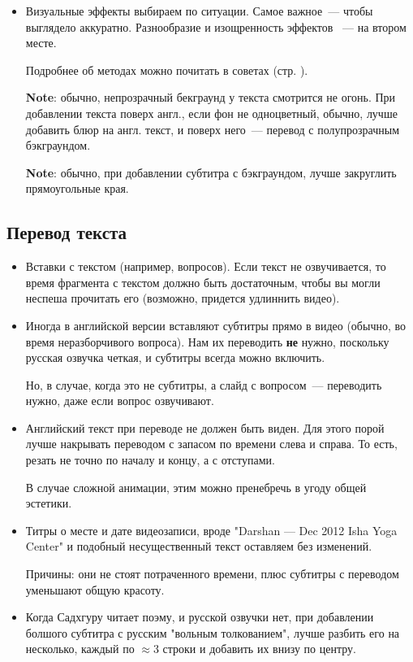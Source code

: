 \documentclass[
a4paper, %
12pt, %
article,
onecolumn, %
openany, %
]{memoir}
\begin{document}
\begin{itemize}
  \item Визуальные эффекты выбираем по ситуации.
        Самое важное~--- чтобы выглядело аккуратно. Разнообразие и изощренность
        эффектов ~--- на втором месте.

        Подробнее об методах можно почитать в советах (стр. \pageref{advices}).

        \textbf{Note}: обычно, непрозрачный бекграунд у текста
        смотрится не огонь. При добавлении текста поверх англ.,
        если фон не одноцветный, обычно, лучше добавить блюр на англ.
        текст, и поверх него~--- перевод с полупрозрачным бэкграундом.

        \textbf{Note}: обычно, при добавлении субтитра с
        бэкграундом, лучше закруглить прямоугольные края.
\end{itemize}



\subsection{Перевод текста}

\begin{itemize}

  \item Вставки с текстом (например, вопросов). Если текст не озвучивается, 
      то время фрагмента с текстом должно быть достаточным, чтобы вы могли 
      неспеша прочитать его (возможно, придется удлиннить видео).

  \item Иногда в английской версии вставляют субтитры прямо в видео
        {\color{gray}(обычно, во время неразборчивого вопроса)}. Нам их переводить
        \textbf{не} нужно, поскольку русская озвучка четкая,
        и субтитры всегда можно включить.

        Но, в случае, когда это не субтитры, а слайд с вопросом~---
        переводить нужно, даже если вопрос озвучивают.
  \item Английский текст при переводе не должен быть виден. Для этого порой лучше
        накрывать переводом с запасом по времени слева и справа. То есть, резать
        не точно по началу и концу, а с отступами.

        В случае сложной анимации, этим можно пренебречь в угоду общей эстетики.


  \item Титры о месте и дате видеозаписи, вроде "Darshan — Dec 2012
        Isha Yoga Center" и подобный несущественный текст оставляем без изменений.

        {\color{gray} Причины: они не стоят потраченного времени, плюс
        субтитры с переводом уменьшают  общую красоту.}

  \item Когда Садхгуру читает поэму, и русской озвучки нет, при добавлении
        болшого субтитра с русским "вольным толкованием", лучше разбить его на
        несколько, каждый
        по $\approx 3$ строки и добавить их внизу по центру.

\end{itemize}
\end{document}
